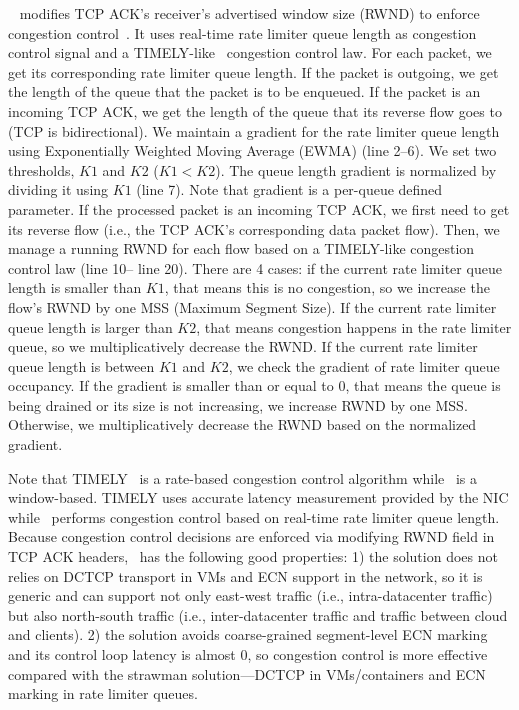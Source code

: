 ~\spring{} modifies TCP ACK's receiver's 
advertised window size (RWND) to enforce congestion control~\cite{he2016ac,vcc}.
It uses real-time rate limiter queue length as congestion control signal and 
a TIMELY-like~\cite{mittal2015timely} congestion control law.
For each packet, 
we get its corresponding rate limiter queue length.
If the packet is outgoing, we get the length of the queue that the packet is to be enqueued.
If the packet is an incoming TCP ACK, we get the length of the queue that 
its reverse flow goes to (TCP is bidirectional).  
We maintain a gradient for the rate limiter queue length using 
Exponentially Weighted Moving Average (EWMA) (line 2--6). 
We set two thresholds, $K1$ and $K2$ ($K1 < K2$). The queue length gradient is normalized by dividing it using $K1$ (line 7).
Note that gradient is a per-queue defined parameter.
If the processed packet is an incoming TCP ACK, we first need to get its reverse 
flow (i.e., the TCP ACK's corresponding data packet flow). Then, 
we manage a running RWND for each flow based on a TIMELY-like congestion control law 
(line 10-- line 20). There are 4 cases: 
if the current rate limiter queue length is smaller than $K1$, that means this is no congestion, so we 
increase the flow's RWND by one MSS (Maximum Segment Size). If the current rate limiter queue length is larger
than $K2$, that means congestion happens in the rate limiter queue, so we multiplicatively decrease the RWND. 
If the current rate limiter queue length is between $K1$ and $K2$, we check the gradient of rate limiter queue occupancy.
If the gradient is smaller than or equal to 0, that means the queue is being drained or its size is not increasing, we 
increase RWND by one MSS. Otherwise, we multiplicatively decrease the RWND based on the normalized gradient.

Note that TIMELY~\cite{mittal2015timely} is a rate-based congestion control algorithm while~\spring{} is a window-based.
TIMELY uses accurate latency measurement provided by the NIC while~\spring{} performs congestion control based on 
real-time rate limiter queue length. Because congestion control decisions are enforced via modifying RWND field in TCP ACK headers,~\spring{} has the following good properties: 
1) the solution does not relies on DCTCP transport in VMs and ECN support in the network, 
so it is generic and can support not only east-west traffic (i.e., intra-datacenter traffic) but also north-south traffic
(i.e., inter-datacenter traffic and traffic between cloud and clients). 
2) the solution avoids coarse-grained segment-level ECN marking and its control loop latency is almost 0, so congestion control
is more effective compared with the strawman solution---DCTCP in VMs/containers and ECN marking in rate limiter queues.  

